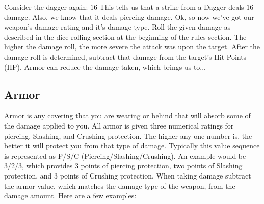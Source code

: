 \documentclass[twoside]{book}
\begin{document}
   Consider the dagger again: \ensuremath{1}\ensuremath{6}\textscbf{}  This tells us that a strike from a Dagger deals \ensuremath{1}\ensuremath{6}\textscbf{}damage. Also, we know that it deals piercing damage.
                Ok, so now we've got our weapon's damage
               rating and it's damage type. Roll the given damage
               as described in the dice rolling section at the beginning
               of the rules section. The higher the damage roll, the more
               severe the attack was upon the target.  After the damage roll is determined, subtract that
               damage from the target's Hit Points (HP). Armor can
               reduce the damage taken, which brings us to...
               
    

\subsection{Armor}
     Armor is any covering that you are wearing or behind
               that will absorb some of the damage applied to you. All
               armor is given three numerical ratings for piercing,
               Slashing, and Crushing protection. The higher any one
               number is, the better it will protect you from that type
               of damage. Typically this value sequence is represented as
               P/S/C (Piercing/Slashing/Crushing). An example would be
               3/2/3, which provides 3 points of piercing protection, two
               points of Slashing protection, and 3 points of Crushing
               protection.  When taking damage subtract the armor value, which
               matches the damage type of the weapon, from the damage
               amount.  Here are a few examples: 
  

  
\end{document}
